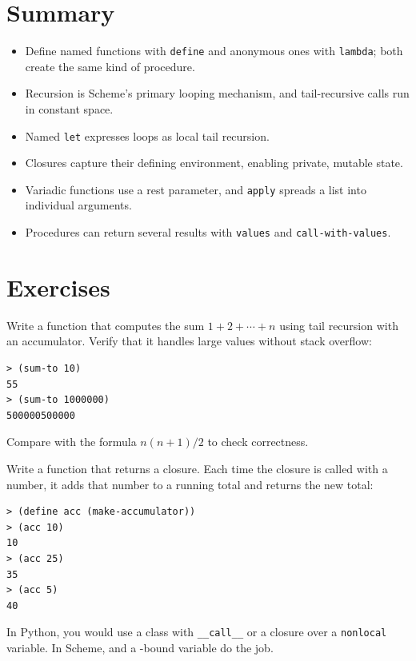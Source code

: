 \section*{Summary}

\begin{itemize}
    \item Define named functions with \texttt{define} and anonymous ones with \texttt{lambda}; both create the same kind of procedure.
    \item Recursion is Scheme's primary looping mechanism, and tail-recursive calls run in constant space.
    \item Named \texttt{let} expresses loops as local tail recursion.
    \item Closures capture their defining environment, enabling private, mutable state.
    \item Variadic functions use a rest parameter, and \texttt{apply} spreads a list into individual arguments.
    \item Procedures can return several results with \texttt{values} and \texttt{call-with-values}.
\end{itemize}

\section*{Exercises}

\begin{exercise}
Write a function  that computes the sum $1 + 2 + \cdots + n$ using tail recursion with an accumulator. Verify that it handles large values without stack overflow:

\begin{lstlisting}[style=repl]
> (sum-to 10)
55
> (sum-to 1000000)
500000500000
\end{lstlisting}

Compare with the formula $n(n+1)/2$ to check correctness.
\end{exercise}

\begin{exercise}
Write a function  that returns a closure. Each time the closure is called with a number, it adds that number to a running total and returns the new total:

\begin{lstlisting}[style=repl]
> (define acc (make-accumulator))
> (acc 10)
10
> (acc 25)
35
> (acc 5)
40
\end{lstlisting}

In Python, you would use a class with \texttt{\_\_call\_\_} or a closure over a \texttt{nonlocal} variable. In Scheme,  and a -bound variable do the job.
\end{exercise}

